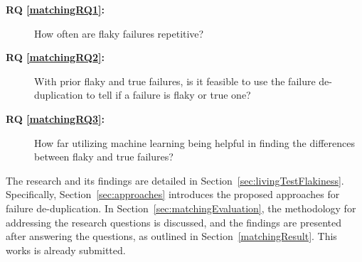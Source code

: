 


\begin{description}
  \item[\textbf{RQ \ref{matchingRQ1}:}] How often are flaky failures repetitive?
  \item[\textbf{RQ \ref{matchingRQ2}:}] With prior flaky and true failures, is it feasible to use the failure de-duplication to tell if a failure is flaky or true one?
  \item[\textbf{RQ \ref{matchingRQ3}:}] How far utilizing machine learning being helpful in finding the differences between flaky and true failures?  
 \end{description}


The research and its findings are detailed in Section~\ref{sec:livingTestFlakiness}. Specifically, Section~\ref{sec:approaches} introduces the proposed approaches for failure de-duplication. In Section~\ref{sec:matchingEvaluation}, the methodology for addressing the research questions is discussed, and the findings are presented after answering the questions, as outlined in Section~\ref{matchingResult}. This works is already submitted.



